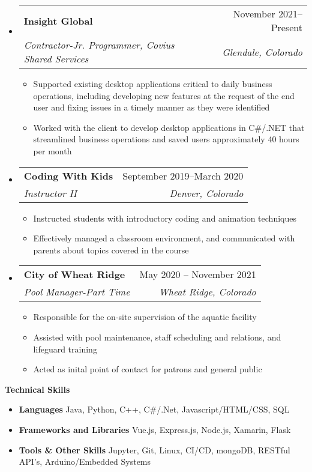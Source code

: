 \documentclass[letterpaper,12pt]{article}[leftmargin=*]
\makeatletter
\def \entryspacing {-0pt}
\renewcommand{\section}[2]{\vspace{5pt}
  \colorbox{secondary}{\color{white}\raggedbottom\normalsize\textbf{{#1}{\hspace{7pt}#2}}}
}
\newcommand{\resumeEntryStart}{\begin{itemize}[leftmargin=2.5mm]}
\newcommand{\resumeEntryEnd}{\end{itemize}\vspace{\entryspacing}}
\newcommand{\resumeItemListStart}{\begin{itemize}[leftmargin=4.5mm]}
\newcommand{\resumeItemListEnd}{\end{itemize}}
\newcommand{\resumeItem}[1]{
  \item\small{
    {#1 \vspace{-2pt}}
  }
}
\newcommand{\resumeEntryTSDL}[4]{
  \vspace{-1pt}\item[]
    \begin{tabularx}{0.97\textwidth}{X@{\hspace{60pt}}r}
      \textbf{\color{primary}#1} & {\firabook\color{accent}\small#2} \\
      \textit{\color{accent}\small#3} & \textit{\color{accent}\small#4} \\
    \end{tabularx}\vspace{-6pt}
}
\newcommand{\resumeEntryS}[2]{
  \item[]\small{
    \textbf{\color{primary}#1 }{ #2 \vspace{-6pt}}
  }
}
\makeatother
\begin{document}
  \resumeEntryStart
  \resumeEntryTSDL
  {Insight Global}{November 2021--Present}
  {Contractor-Jr. Programmer, Covius Shared Services}{Glendale, Colorado}
   
  \resumeItemListStart
  \resumeItem{Supported existing desktop applications critical to daily business operations, including developing new features at the request of the end user and fixing issues in a timely manner as they were identified}
  \resumeItem{Worked with the client to develop desktop applications in C\#/.NET that streamlined business operations and saved users approximately 40 hours per month}
  \resumeItemListEnd
\resumeEntryEnd

\resumeEntryStart
\resumeEntryTSDL
  {Coding With Kids}{September 2019--March 2020}
  {Instructor II}{Denver, Colorado}
\resumeItemListStart
  \resumeItem {Instructed students with introductory coding and animation techniques}
  \resumeItem {Effectively managed a classroom environment, and communicated with parents about topics covered in the course} 
\resumeItemListEnd
\resumeEntryEnd

  \resumeEntryStart
    \resumeEntryTSDL
      {City of Wheat Ridge}{May 2020 -- November 2021}
      {Pool Manager-Part Time}{Wheat Ridge, Colorado}
    \resumeItemListStart
      \resumeItem {Responsible for the on-site supervision of the aquatic facility}
      \resumeItem {Assisted with pool maintenance, staff scheduling and relations, and lifeguard training}
      \resumeItem {Acted as inital point of contact for patrons and general public}
    \resumeItemListEnd
  \resumeEntryEnd








\section{\faGears}{Technical Skills}
 \resumeEntryStart
  \resumeEntryS{Languages } {Java, Python, C++, C\#/.Net, Javascript/HTML/CSS, SQL}
  \resumeEntryS{Frameworks and Libraries } {Vue.js, Express.js, Node.js, Xamarin, Flask}
  \resumeEntryS{Tools \& Other Skills }{ Jupyter, Git, Linux, CI/CD, mongoDB, RESTful API's, Arduino/Embedded Systems}
 \resumeEntryEnd
\end{document}
